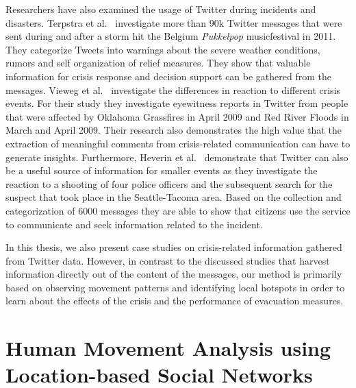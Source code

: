 Researchers have also examined the usage of Twitter during incidents and disasters.  Terpstra et al.~\cite{terpstra2012towards} investigate more than 90k Twitter messages that were sent during and after a storm hit the Belgium \textit{Pukkelpop} musicfestival in 2011. 
They categorize Tweets into warnings about the severe weather conditions, rumors and self organization of relief measures. 
They show that valuable information for crisis response and decision support can be gathered from the messages. 
Vieweg et al.~\cite{Vieweg:2010:MTN} investigate the differences in reaction to different crisis events.
For their study they investigate eyewitness reports in Twitter from people that were affected by Oklahoma Grassfires in April 2009 and Red River Floods in March and April 2009. Their research also demonstrates the high value that the extraction of meaningful comments from crisis-related communication can have to generate insights.
Furthermore, Heverin et al.~\cite{heverin2010microblogging} demonstrate that Twitter can also be a useful source of information for smaller events as they investigate the reaction to a shooting of four police officers and the subsequent search for the suspect that took place in the Seattle-Tacoma area. Based on the collection and categorization of 6000 messages they are able to show that citizens use the service to communicate and seek information related to the incident.

In this thesis, we also present case studies on crisis-related information gathered from Twitter data.
However, in contrast to the discussed studies that harvest information directly out of the content of the messages, our method is primarily based on observing movement patterns and identifying local hotspots in order to learn about the effects of the crisis and the performance of evacuation measures.


\section{Human Movement Analysis using Location-based Social Networks}

